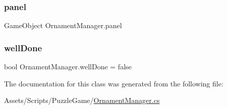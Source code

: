 \mbox{\label{class_ornament_manager_a774b255d77938f0e0172b62a334f3c90}} 
\subsubsection{\texorpdfstring{panel}{panel}}
{\footnotesize\ttfamily Game\+Object Ornament\+Manager.\+panel}

\mbox{\label{class_ornament_manager_a5e8539e721f6c95e3f6d080851dc1219}} 
\subsubsection{\texorpdfstring{well\+Done}{wellDone}}
{\footnotesize\ttfamily bool Ornament\+Manager.\+well\+Done = false}



The documentation for this class was generated from the following file\+:\begin{DoxyCompactItemize}
\item 
Assets/\+Scripts/\+Puzzle\+Game/\mbox{\hyperlink{_ornament_manager_8cs}{Ornament\+Manager.\+cs}}\end{DoxyCompactItemize}
